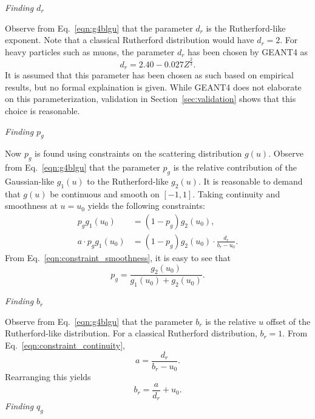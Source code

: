 \noindent \textit{\large{Finding $d_r$}}


Observe from Eq.~\eqref{eqn:g4blgu} that the parameter $d_r$ is the Rutherford-like exponent. Note that a classical Rutherford distribution would have $d_r=2$. For heavy particles such as muons, the parameter $d_r$ has been chosen by GEANT4 \cite{geant4} as
\begin{equation}
d_r=2.40-0.027Z^{\frac{2}{3}}.
\label{eqn:geantd}
\end{equation}
It is assumed that this parameter has been chosen as such based on empirical results, but no formal explaination is given. While GEANT4 \cite{geant4} does not elaborate on this parameterization, validation in Section~\ref{sec:validation} shows that this choice is reasonable.

\noindent \textit{\large{Finding $p_g$}}

Now $p_g$ is found using constraints on the scattering distribution $g(u)$. Observe from Eq.~\eqref{eqn:g4blgu} that the parameter $p_g$ is the relative contribution of the Gaussian-like $g_1(u)$ to the Rutherford-like $g_2(u)$. It is reasonable to demand that $g(u)$ be continuous and smooth on $[-1,1]$. Taking continuity and smoothness at $u=u_0$ yields the following constraints:
%
\begin{align}
p_g g_1(u_0)&=(1-p_g)g_2(u_0), \label{eqn:constraint_smoothness}\\
a\cdot p_g g_1(u_0)&=(1-p_g)g_2(u_0)\cdot\frac{d_r}{b_r-u_0}. \label{eqn:constraint_continuity}
\end{align}
%
From Eq.~\eqref{eqn:constraint_smoothness}, it is easy to see that
%
\begin{equation}
p_g=\frac{g_2(u_0)}{g_1(u_0)+g_2(u_0)}.
\label{eqn:geantp}
\end{equation}
%

\noindent \textit{\large{Finding $b_r$}}

Observe from Eq.~\eqref{eqn:g4blgu} that the parameter $b_r$ is the relative $u$ offset of the Rutherford-like distribution. For a classical Rutherford distribution, $b_r=1$. From Eq.~\eqref{eqn:constraint_continuity},
%
\begin{equation}\nonumber
a=\frac{d_r}{b_r-u_0}.
\end{equation}
%
Rearranging this yields
%
\begin{equation}
b_r=\frac{a}{d_r}+u_0.
\label{eqn:geantb}
\end{equation}
%
\noindent \textit{\large{Finding $q_g$}}

